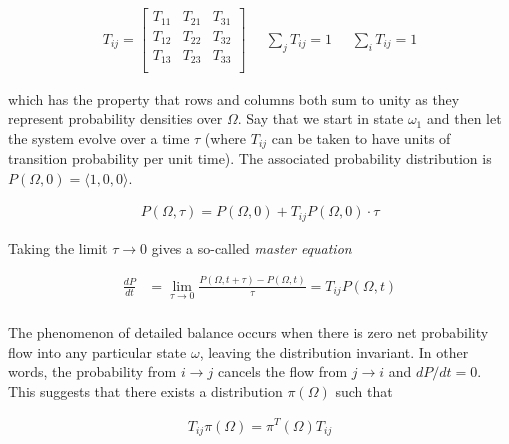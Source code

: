 \documentclass{article}
\begin{document}
\begin{align*}
T_{ij} = \begin{bmatrix} 
    T_{11}&T_{21}&T_{31}\\
	T_{12}&T_{22}&T_{32}\\
	T_{13}&T_{23}&T_{33}\\
    \end{bmatrix}
\;\;\;\;\; \sum_{j}T_{ij} = 1 \;\;\;\;\; \sum_{i}T_{ij} = 1
\end{align*}

which has the property that rows and columns both sum to unity as they represent probability densities over $\Omega$. Say that we start in state $\omega_{1}$ and then let the system evolve over a time $\tau$ (where $T_{ij}$ can be taken to have units of transition probability per unit time). The associated probability distribution is $P(\Omega,0) = \langle 1, 0, 0\rangle$.

\begin{align*}
P(\Omega,\tau) = P(\Omega,0) + T_{ij}P(\Omega,0)\cdot \tau
\end{align*}

Taking the limit $\tau\rightarrow 0$ gives a so-called \emph{master equation}

\begin{align*}
\frac{dP}{dt} &= \underset{\tau\rightarrow 0}{\lim} \frac{P(\Omega,t+\tau) - P(\Omega,t)}{\tau} = T_{ij}P(\Omega,t)\\
\end{align*}


The phenomenon of detailed balance occurs when there is zero net probability flow into any particular state $\omega$, leaving the distribution invariant. In other words, the probability from $i\rightarrow j$ cancels the flow from $j\rightarrow i$ and $dP/dt = 0$. This suggests that there exists a distribution $\pi(\Omega)$ such that

\begin{align*}
T_{ij}\pi(\Omega) = \pi^{T}(\Omega)T_{ij}
\end{align*}
\end{document}
